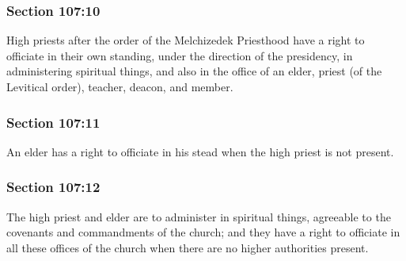 	\subsubsection{Section 107:10} %
		\label{DC107-10}

		High priests after the order of the Melchizedek Priesthood have a right to officiate in their own standing, under the direction of the presidency, in administering spiritual things, and also in the office of an elder, priest (of the Levitical order), teacher, deacon, and member.


	\subsubsection{Section 107:11} %
		\label{DC107-11}

		An elder has a right to officiate in his stead when the high priest is not present.


	\subsubsection{Section 107:12} %
		\label{DC107-12}

		The high priest and elder are to administer in spiritual things, agreeable to the covenants and commandments of the church; and they have a right to officiate in all these offices of the church when there are no higher authorities present.


